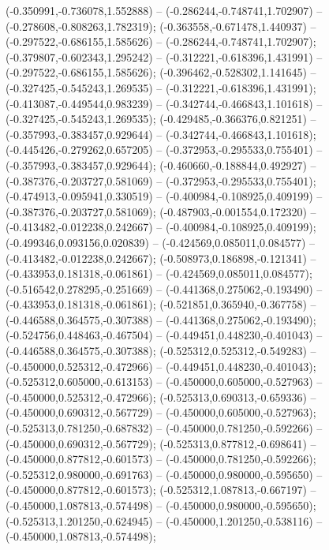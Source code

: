  (-0.350991,-0.736078,1.552888) -- (-0.286244,-0.748741,1.702907) -- (-0.278608,-0.808263,1.782319);
 (-0.363558,-0.671478,1.440937) -- (-0.297522,-0.686155,1.585626) -- (-0.286244,-0.748741,1.702907);
 (-0.379807,-0.602343,1.295242) -- (-0.312221,-0.618396,1.431991) -- (-0.297522,-0.686155,1.585626);
 (-0.396462,-0.528302,1.141645) -- (-0.327425,-0.545243,1.269535) -- (-0.312221,-0.618396,1.431991);
 (-0.413087,-0.449544,0.983239) -- (-0.342744,-0.466843,1.101618) -- (-0.327425,-0.545243,1.269535);
 (-0.429485,-0.366376,0.821251) -- (-0.357993,-0.383457,0.929644) -- (-0.342744,-0.466843,1.101618);
 (-0.445426,-0.279262,0.657205) -- (-0.372953,-0.295533,0.755401) -- (-0.357993,-0.383457,0.929644);
 (-0.460660,-0.188844,0.492927) -- (-0.387376,-0.203727,0.581069) -- (-0.372953,-0.295533,0.755401);
 (-0.474913,-0.095941,0.330519) -- (-0.400984,-0.108925,0.409199) -- (-0.387376,-0.203727,0.581069);
 (-0.487903,-0.001554,0.172320) -- (-0.413482,-0.012238,0.242667) -- (-0.400984,-0.108925,0.409199);
 (-0.499346,0.093156,0.020839) -- (-0.424569,0.085011,0.084577) -- (-0.413482,-0.012238,0.242667);
 (-0.508973,0.186898,-0.121341) -- (-0.433953,0.181318,-0.061861) -- (-0.424569,0.085011,0.084577);
 (-0.516542,0.278295,-0.251669) -- (-0.441368,0.275062,-0.193490) -- (-0.433953,0.181318,-0.061861);
 (-0.521851,0.365940,-0.367758) -- (-0.446588,0.364575,-0.307388) -- (-0.441368,0.275062,-0.193490);
 (-0.524756,0.448463,-0.467504) -- (-0.449451,0.448230,-0.401043) -- (-0.446588,0.364575,-0.307388);
 (-0.525312,0.525312,-0.549283) -- (-0.450000,0.525312,-0.472966) -- (-0.449451,0.448230,-0.401043);
 (-0.525312,0.605000,-0.613153) -- (-0.450000,0.605000,-0.527963) -- (-0.450000,0.525312,-0.472966);
 (-0.525313,0.690313,-0.659336) -- (-0.450000,0.690312,-0.567729) -- (-0.450000,0.605000,-0.527963);
 (-0.525313,0.781250,-0.687832) -- (-0.450000,0.781250,-0.592266) -- (-0.450000,0.690312,-0.567729);
 (-0.525313,0.877812,-0.698641) -- (-0.450000,0.877812,-0.601573) -- (-0.450000,0.781250,-0.592266);
 (-0.525312,0.980000,-0.691763) -- (-0.450000,0.980000,-0.595650) -- (-0.450000,0.877812,-0.601573);
 (-0.525312,1.087813,-0.667197) -- (-0.450000,1.087813,-0.574498) -- (-0.450000,0.980000,-0.595650);
 (-0.525313,1.201250,-0.624945) -- (-0.450000,1.201250,-0.538116) -- (-0.450000,1.087813,-0.574498);
